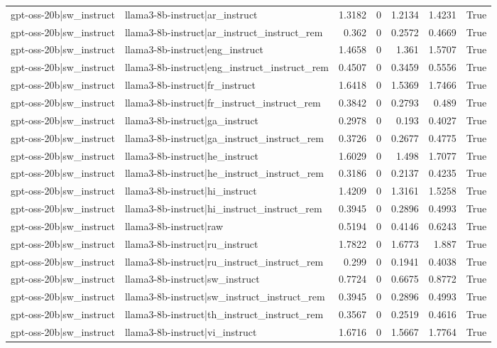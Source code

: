 \begin{table}
\begin{tabular}{l l r r r r l}
gpt-oss-20b|sw_instruct & llama3-8b-instruct|ar_instruct & 1.3182 & 0 & 1.2134 & 1.4231 & True \\
gpt-oss-20b|sw_instruct & llama3-8b-instruct|ar_instruct_instruct_rem & 0.362 & 0 & 0.2572 & 0.4669 & True \\
gpt-oss-20b|sw_instruct & llama3-8b-instruct|eng_instruct & 1.4658 & 0 & 1.361 & 1.5707 & True \\
gpt-oss-20b|sw_instruct & llama3-8b-instruct|eng_instruct_instruct_rem & 0.4507 & 0 & 0.3459 & 0.5556 & True \\
gpt-oss-20b|sw_instruct & llama3-8b-instruct|fr_instruct & 1.6418 & 0 & 1.5369 & 1.7466 & True \\
gpt-oss-20b|sw_instruct & llama3-8b-instruct|fr_instruct_instruct_rem & 0.3842 & 0 & 0.2793 & 0.489 & True \\
gpt-oss-20b|sw_instruct & llama3-8b-instruct|ga_instruct & 0.2978 & 0 & 0.193 & 0.4027 & True \\
gpt-oss-20b|sw_instruct & llama3-8b-instruct|ga_instruct_instruct_rem & 0.3726 & 0 & 0.2677 & 0.4775 & True \\
gpt-oss-20b|sw_instruct & llama3-8b-instruct|he_instruct & 1.6029 & 0 & 1.498 & 1.7077 & True \\
gpt-oss-20b|sw_instruct & llama3-8b-instruct|he_instruct_instruct_rem & 0.3186 & 0 & 0.2137 & 0.4235 & True \\
gpt-oss-20b|sw_instruct & llama3-8b-instruct|hi_instruct & 1.4209 & 0 & 1.3161 & 1.5258 & True \\
gpt-oss-20b|sw_instruct & llama3-8b-instruct|hi_instruct_instruct_rem & 0.3945 & 0 & 0.2896 & 0.4993 & True \\
gpt-oss-20b|sw_instruct & llama3-8b-instruct|raw & 0.5194 & 0 & 0.4146 & 0.6243 & True \\
gpt-oss-20b|sw_instruct & llama3-8b-instruct|ru_instruct & 1.7822 & 0 & 1.6773 & 1.887 & True \\
gpt-oss-20b|sw_instruct & llama3-8b-instruct|ru_instruct_instruct_rem & 0.299 & 0 & 0.1941 & 0.4038 & True \\
gpt-oss-20b|sw_instruct & llama3-8b-instruct|sw_instruct & 0.7724 & 0 & 0.6675 & 0.8772 & True \\
gpt-oss-20b|sw_instruct & llama3-8b-instruct|sw_instruct_instruct_rem & 0.3945 & 0 & 0.2896 & 0.4993 & True \\
gpt-oss-20b|sw_instruct & llama3-8b-instruct|th_instruct_instruct_rem & 0.3567 & 0 & 0.2519 & 0.4616 & True \\
gpt-oss-20b|sw_instruct & llama3-8b-instruct|vi_instruct & 1.6716 & 0 & 1.5667 & 1.7764 & True \\

\end{tabular}
\end{table}
